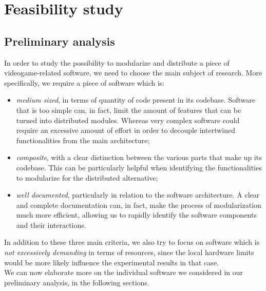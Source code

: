 
\chapter{Feasibility study}
\label{cap:feasibility-study}


\section{Preliminary analysis}
In order to study the possibility to modularize and distribute a piece of videogame-related software, we need to choose the main subject of research. More specifically, we require a piece of software which is:
\begin{itemize}
	\item \textit{medium sized}, in terms of quantity of code present in its codebase. Software that is too simple can, in fact, limit the amount of features that can be turned into distributed modules. Whereas very complex software could require an excessive amount of effort in order to decouple intertwined functionalities from the main architecture;
	\item \textit{composite}, with a clear distinction between the various parts that make up its codebase. This can be particularly helpful when identifying the functionalities to modularize for the distributed alternative;
	\item \textit{well documented}, particularly in relation to the software architecture. A clear and complete documentation can, in fact, make the process of modularization much more efficient, allowing us to rapidly identify the software components and their interactions.
\end{itemize} 
In addition to these three main criteria, we also try to focus on software which is \textit{not excessively demanding} in terms of resources, since the local hardware limits would be more likely influence the experimental results in that case. \\
We can now elaborate more on the individual software we considered in our preliminary analysis, in the following sections.

